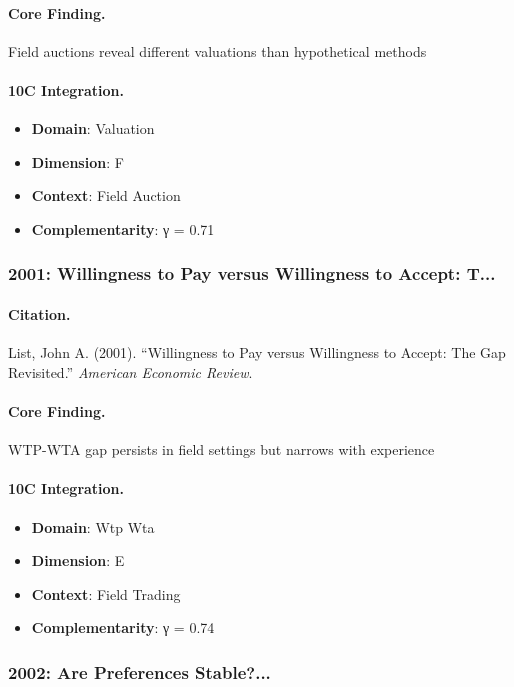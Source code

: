 \paragraph{Core Finding.}
Field auctions reveal different valuations than hypothetical methods

\paragraph{10C Integration.}
\begin{itemize}[nosep]
  \item \textbf{Domain}: Valuation
  \item \textbf{Dimension}: F
  \item \textbf{Context}: Field Auction
  \item \textbf{Complementarity}: γ = 0.71
\end{itemize}


\subsubsection{2001: Willingness to Pay versus Willingness to Accept: T...}

\paragraph{Citation.}
List, John A. (2001). ``Willingness to Pay versus Willingness to Accept: The Gap Revisited.''
\textit{American Economic Review}.

\paragraph{Core Finding.}
WTP-WTA gap persists in field settings but narrows with experience

\paragraph{10C Integration.}
\begin{itemize}[nosep]
  \item \textbf{Domain}: Wtp Wta
  \item \textbf{Dimension}: E
  \item \textbf{Context}: Field Trading
  \item \textbf{Complementarity}: γ = 0.74
\end{itemize}


\subsubsection{2002: Are Preferences Stable?...}

